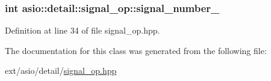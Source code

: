 \subsubsection[{signal\+\_\+number\+\_\+}]{\setlength{\rightskip}{0pt plus 5cm}int asio\+::detail\+::signal\+\_\+op\+::signal\+\_\+number\+\_\+}\label{classasio_1_1detail_1_1signal__op_a3ca07d986aeb62051c9c4af5104a2dff}


Definition at line 34 of file signal\+\_\+op.\+hpp.



The documentation for this class was generated from the following file\+:\begin{DoxyCompactItemize}
\item 
ext/asio/detail/\hyperlink{signal__op_8hpp}{signal\+\_\+op.\+hpp}\end{DoxyCompactItemize}
